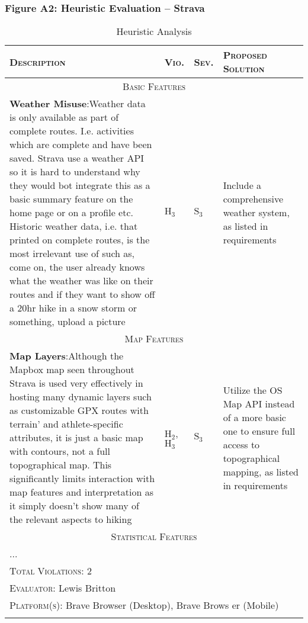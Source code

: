 \documentclass[11pt, english]{article}
\begin{document}
\newpage

		\subsubsection*{Figure A2: Heuristic Evaluation -- Strava}

	\begin{center}
                \scriptsize
        	\begin{longtable}{p{7.5cm}p{0.5cm}p{0.5cm}p{4cm}}
                \textsc{Description} & \textsc{Vio.} & \textsc{Sev.} & \textsc{Proposed Solution}\\
                \hline
		\hline
		\multicolumn{4}{c}{\textsc{Basic Features}}\\
		\hline
			\textbf{Weather Misuse}:\newline Weather data is only available as part of complete routes. I.e. activities which are complete and have been saved. Strava use a weather API so it is hard to understand why they would bot integrate this as a basic summary feature on the home page or on a profile etc. Historic weather data, i.e. that printed on complete routes, is the most irrelevant use of such as, come on, the user already knows what the weather was like on their routes and if they want to show off a 20hr hike in a snow storm or something, upload a picture & $\mathrm{H_{3}}$ & $\mathrm{S_{3}}$ & Include a comprehensive weather system, as listed in requirements\\
		\hline
		\multicolumn{4}{c}{\textsc{Map Features}}\\
		\hline
			\textbf{Map Layers}:\newline Although the Mapbox map seen throughout Strava is used very effectively in hosting many dynamic layers such as customizable GPX routes with terrain' and athlete-specific attributes, it is just a basic map with contours, not a full topographical map. This significantly limits interaction with map features and interpretation as it simply doesn't show many of the relevant aspects to hiking & $\mathrm{H_{2}}$, $\mathrm{H_{3}}$ & $\mathrm{S_{3}}$ & Utilize the OS Map API instead of a more basic one to ensure full access to topographical mapping, as listed in requirements\\
		\hline
		\multicolumn{4}{c}{\textsc{Statistical Features}}\\
		\hline
		...\\
		\hline
		\hline
                \multicolumn{4}{l}{\textsc{Total Violations}: 2}\\
                \multicolumn{4}{l}{\textsc{Evaluator}: Lewis Britton}\\
                \multicolumn{4}{l}{\textsc{Platform(s)}: Brave Browser (Desktop), Brave Brows
er (Mobile)}\\
                \hline
                \caption{Heuristic Analysis}
        \end{longtable}
        \end{center}
\end{document}
